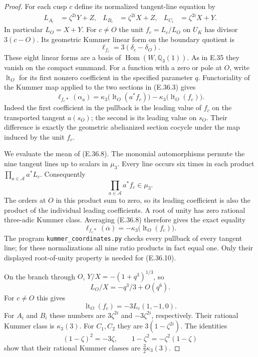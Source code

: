 \begin{proof}
For each cusp $c$ define its normalized
tangent-line equation by
\[
 \begin{aligned}
 L_{A_i}&=\zeta^{2i}Y+Z,&
 L_{B_i}&=\zeta^{2i}X+Z,&
 L_{C_i}&=\zeta^{2i}X+Y.
 \end{aligned}
\]
In particular $L_O=X+Y$. For $c\ne O$ the
unit $f_c=L_c/L_O$ on $U_K$ has divisor
$3(c-O)$. Its geometric Kummer linear form
on the boundary quotient is
\[
                   \ell_{f_c}=3(\delta_c-\delta_O).
 \tag{E.36.7}
\]
These eight linear forms are a basis of
$\operatorname{Hom}(W,\mathbb Q_3(1))$.
As in E.35 they vanish on the compact
summand. For a function with a zero or
pole at $O$, write $\operatorname{lt}_O$
for its first nonzero coefficient in the
specified parameter $q$.
Functoriality of the Kummer map applied to
the two sections in (E.36.3) gives
\[
 \ell_{f_c*}(\alpha_a)=
     \kappa_3\bigl(\operatorname{lt}_O(a^*f_c)\bigr)
       -\kappa_3\bigl(\operatorname{lt}_O(f_c)\bigr).
 \tag{E.36.8}
\]
Indeed the first coefficient in the
pullback is the leading value of $f_c$
on the transported tangent $a(s_O)$;
the second is its leading value on $s_O$.
Their difference is exactly the geometric
abelianized section cocycle under the
map induced by the unit $f_c$.

We evaluate the mean of (E.36.8).
The monomial automorphisms permute the nine
tangent lines up to scalars in $\mu_3$.
Every line occurs six times in each
product $\prod_{a\in\mathcal A}a^*L_c$.
Consequently
\[
       \prod_{a\in\mathcal A}a^*f_c\in\mu_3.
 \tag{E.36.9}
\]
The orders at $O$ in this product sum to
zero, so its leading coefficient is also
the product of the individual leading
coefficients. A root of unity has zero
rational three-adic Kummer class. Averaging
(E.36.8) therefore gives the exact equality
\[
 \ell_{f_c*}(\overline\alpha)
      =-\kappa_3\bigl(\operatorname{lt}_O(f_c)\bigr).
 \tag{E.36.10}
\]
The program \texttt{kummer\_coordinates.py}
checks every pullback of every tangent
line; for these normalizations all nine
ratio products in fact equal one. Only
their displayed root-of-unity property
is needed for (E.36.10).

On the branch through $O$,
$Y/X=-(1+q^3)^{1/3}$, so
\[
             L_O/X=-q^3/3+O(q^6).
\]
For $c\ne O$ this gives
\[
 \operatorname{lt}_O(f_c)=-3L_c(1,-1,0).
 \tag{E.36.11}
\]
For $A_i$ and $B_i$ these numbers are
$3\zeta^{2i}$ and $-3\zeta^{2i}$,
respectively. Their rational Kummer class
is $\kappa_3(3)$. For $C_1,C_2$ they are
$3(1-\zeta^{2i})$. The identities
\[
 (1-\zeta)^2=-3\zeta,\qquad
 1-\zeta^2=-\zeta^2(1-\zeta)
\]
show that their rational Kummer classes
are $\tfrac32\kappa_3(3)$.


\end{proof}
